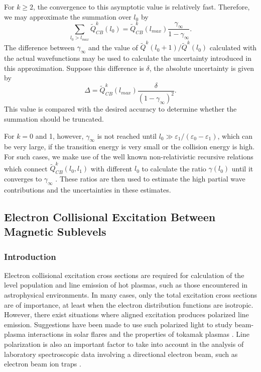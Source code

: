 For $k \ge 2$,
the convergence to this asymptotic value is relatively fast. Therefore, we may
approximate the summation over $l_0$ by
\begin{equation}
\sum_{l_0>l_{max}}\tilde{Q}^k_{CB}(l_0) =
\tilde{Q}^k_{CB}(l_{max})\frac{\gamma_{\infty}}{1-\gamma_{\infty}}. 
\end{equation}
The difference between $\gamma_{\infty}$ and the value of 
$\tilde{Q}^k(l_0+1)/\tilde{Q}^k(l_0)$ calculated with the actual wavefunctions
may be used to calculate the uncertainty introduced in this
approximation. Suppose this 
difference is $\delta$, the absolute uncertainty is given by
\begin{equation}
\Delta = \tilde{Q}^k_{CB}(l_{max})\frac{\delta}{(1-\gamma_{\infty})^2}.
\end{equation}
This value is compared with the desired accuracy to determine whether the
summation should be truncated.

For $k = 0$ and 1, however, $\gamma_\infty$ is not reached until $l_0 \gg
\varepsilon_1/(\varepsilon_0-\varepsilon_1)$, which can be very large, if the
transition energy is very small or the collision
energy is high. For such cases, we make use of the well known non-relativistic
recursive relations which connect
$\tilde{Q}^k_{CB}(l_0,l_1)$ with different $l_0$ to calculate the ratio
$\gamma(l_0)$ until it converges to 
$\gamma_{\infty}$ \cite{burgess74}. These ratios are then used to estimate
the high partial wave contributions and the uncertainties in these estimates.

\subsection{Electron Collisional Excitation Between Magnetic Sublevels}
\subsubsection{Introduction}
Electron collisional excitation cross sections are required for calculation of
the level population and line emission of hot plasmas, such as those
encountered in astrophysical environments. In many cases, only the total
excitation cross sections are of importance, at least when the electron
distribution functions are isotropic. However, there exist situations where
aligned excitation produces polarized line emission. Suggestions have been
made to use such polarized light to study beam-plasma interactions in solar
flares \citep{haug72, haug81} and the properties of tokamak plasmas
\citep{fujimoto96}. Line polarization is also an important factor to take into
account in the analysis of laboratory spectroscopic data involving a
directional electron beam, such as electron beam ion traps
\citep{beiersdorfer96, takacs96}. 

